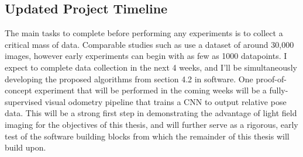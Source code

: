 \documentclass[openany]{book}
\begin{document}
\subsection{Updated Project Timeline}
The main tasks to complete before performing any experiments is to collect a critical mass of data. Comparable studies such as \cite{zhou2017unsupervised} use a dataset of around 30,000 images, however early experiments can begin with as few as 1000 datapoints. I expect to complete data collection in the next 4 weeks, and I'll be simultaneously developing the proposed algorithms from section 4.2 in software. One proof-of-concept experiment that will be performed in the coming weeks will be a fully-supervised visual odometry pipeline that trains a CNN to output relative pose data. This will be a strong first step in demonstrating the advantage of light field imaging for the objectives of this thesis, and will further serve as a rigorous, early test of the software building blocks from which the remainder of this thesis will build upon. 


\newpage



\end{document}
